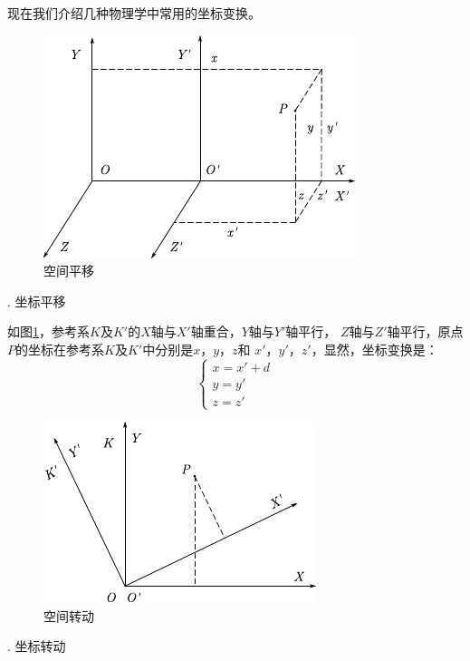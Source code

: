 现在我们介绍几种物理学中常用的坐标变换。

\begin{figure}
    \centering
    \includegraphics{figure/fig02.02}
    \caption{空间平移}
    \label{fig:02.02}
\end{figure}
. 坐标平移 \normalfont

如图\ref{fig:02.02}，参考系$K$及$K'$的$X$轴与$X'$轴重合，$Y$轴与$Y'$轴平行，
$Z$轴与$Z'$轴平行，原点$P$的坐标在参考系$K$及$K'$中分别是$x$，$y$，$z$和
$x'$，$y'$，$z'$，显然，坐标变换是：\vspace{-0.2em}
\begin{equation}\label{eqn:02.02.03}
    \left\{\begin{array}{l}
        x=x'+d \\
        y=y' \\
        z=z'
    \end{array}\right.
\end{equation}

\begin{figure}
    \centering
    \includegraphics{figure/fig02.03}
    \caption{空间转动}
    \label{fig:02.03}
\end{figure}
. 坐标转动 \normalfont


